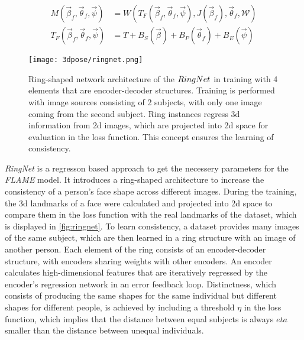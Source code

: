 \begin{equation}
\label{eq:flame}
\begin{split}
M(\vec{\beta}_{f},\vec{\theta}_{f}, \vec{\psi}) &= W(T_{F}(\vec{\beta}_{f},\vec{\theta}_{f}, \vec{\psi}),J(\vec{\beta}_{f}),\vec{\theta}_{f},\mathcal{W}) \\
T_{F}(\vec{\beta}_{f},\vec{\theta}_{f}, \vec{\psi}) &= T + B_{S}(\vec{\beta}) + B_{P}(\vec{\theta}_{f}) + B_{E} (\vec{\psi})
\end{split}
\end{equation}

\begin{figure}[h]
	\centering
	\texttt{[image: 3dpose/ringnet.png]}
	\caption{Ring-shaped network architecture of the $\protect RingNet$ in training with 4 elements that are encoder-decoder structures. Training is performed with image sources consisting of 2 subjects, with only one image coming from the second subject. Ring instances regress 3d information from 2d images, which are projected into 2d space for evaluation in the loss function. This concept ensures the learning of consistency.\cite{ringnet}}
	\label{fig:ringnet}
\end{figure}

\emph{RingNet} is a regresson based approach to get the necessery parameters for the \emph{FLAME} model. It introduces a ring-shaped architecture to increase the consistency of a person's face shape across different images. During the training, the 3d landmarks of a face were calculated and projected into 2d space to compare them in the loss function with the real landmarks of the dataset, which is displayed in \autoref{fig:ringnet}. To learn consistency, a dataset provides many images of the same subject, which are then learned in a ring structure with an image of another person. Each element of the ring consists of an encoder-decoder structure, with encoders sharing weights with other encoders. An encoder calculates high-dimensional features that are iteratively regressed by the encoder's regression network in an error feedback loop. Distinctness, which consists of producing the same shapes for the same individual but different shapes for different people, is achieved by including a threshold $\eta$ in the loss function, which implies that the distance between equal subjects is always $eta$ smaller than the distance between unequal individuals. \cite{ringnet}
